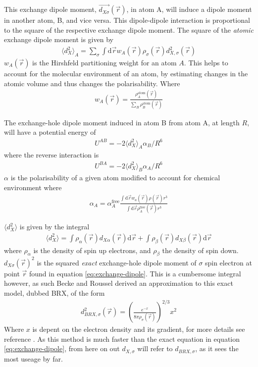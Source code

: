 \documentclass[10pt,a4paper,twocolumn,twoside]{extarticle}
\renewcommand{\d}{\text{d}}
\begin{document}
	This exchange dipole moment, $\vec{d_{X\sigma}}(\vec{r})$, in atom A, will induce a dipole moment in another atom, B, and vice versa. This dipole-dipole interaction is proportional to the square of the respective exchange dipole moment. The square of the \emph{atomic} exchange dipole moment is given by
	\begin{align}
		\langle d_{X}^2 \rangle_A = \sum_\sigma \int \d\vec{r} w_A(\vec{r}) \rho_\sigma(\vec{r}) d_{X,\sigma}^2(\vec{r})
	\end{align}
	$w_A(\vec{r})$ is the Hirshfeld partitioning weight for an atom $A$. This helps to account for the molecular environment of an atom, by estimating changes in the atomic volume and thus changes the polarisability. 
	Where 
	\begin{align}
		w_A(\vec{r}) = \frac{\rho_A^\text{atom}(\vec{r})}{\sum_B\rho_B^\text{atom}(\vec{r})}
	\end{align}

	The exchange-hole dipole moment induced in atom B from atom A, at length $R$, will have a potential energy of 
	\begin{align}
		U^{AB} = -2\langle d_X^2 \rangle_A \alpha_B / R^6
	\end{align} 
	where the reverse interaction is  
	\begin{align}
		U^{BA} = -2\langle d_X^2 \rangle_B \alpha_A / R^6
	\end{align} 
	$\alpha$ is the polarisability of a given atom modified to account for chemical environment where
	\begin{align}
		\alpha_A = \alpha_A^\text{free} \frac{\int\d\vec{r} w_a(\vec{r})\rho(\vec{r})r^3}{\int \d\vec{r}\rho_A^\text{free}(\vec{r})r^3}
	\end{align}
	
	
	$\langle d_X^2 \rangle$ is given by the integral
	\begin{align}
		\langle d_X^2 \rangle = \int \rho_\alpha(\vec{r}) d_{X\alpha}(\vec{r}) \d \vec{r} +
								\int \rho_\beta(\vec{r}) d_{X\beta}(\vec{r}) \d \vec{r}
	\end{align}
	where $\rho_\alpha$ is the density of spin up electrons, and $\rho_\beta$ the density of spin down. $d_{X\sigma}(\vec{r})^2$ is the squared \emph{exact} exchange-hole dipole moment of $\sigma$ spin electron at point $\vec{r}$ found in equation \ref{eq:exchange-dipole}. This is a cumbersome integral however, as such Becke and Roussel derived an approximation to this exact model, dubbed BRX, of the form
	\begin{align}
		d_{BRX,\sigma}^2(\vec{r}) = \left(\frac{e^{-x}}{8\pi\rho_\sigma(\vec{r})}\right)^{2/3}x^2
	\end{align} 
	Where $x$ is depent on the electron density and its gradient, for more details see reference \cite{XDM-original}. As this method is much faster than the exact equation in equation \ref{eq:exchange-dipole}, from here on out $d_{X,\sigma}$ will refer to $d_{BRX,\sigma}$, as it sees the most useage by far. 
\end{document}
